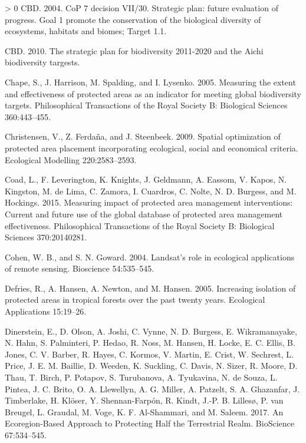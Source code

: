 \documentclass[11pt]{article}
\newlength{\cslhangindent}
\newenvironment{CSLReferences}[3] %
 {%
  \setlength{\parindent}{0pt}
  \ifodd #1 \everypar{\setlength{\hangindent}{\cslhangindent}}\ignorespaces\fi
  \ifnum #2 > 0
  \setlength{\parskip}{#2\baselineskip}
  \fi
 }%
 {}
\begin{document}
\begin{CSLReferences}{1}{0}
\leavevmode\hypertarget{ref-cbd2004}{}%
CBD. 2004. CoP 7 decision VII/30. Strategic plan: future evaluation of
progress. Goal 1 promote the conservation of the biological diversity of
ecosystems, habitats and biomes; Target 1.1.

\leavevmode\hypertarget{ref-cbd2010}{}%
CBD. 2010. The strategic plan for biodiversity 2011-2020 and the Aichi
biodiversity targests.

\leavevmode\hypertarget{ref-chapeMeasuringExtentEffectiveness2005}{}%
Chape, S., J. Harrison, M. Spalding, and I. Lysenko. 2005. Measuring the
extent and effectiveness of protected areas as an indicator for meeting
global biodiversity targets. Philosophical Transactions of the Royal
Society B: Biological Sciences 360:443--455.

\leavevmode\hypertarget{ref-christensen2009}{}%
Christensen, V., Z. Ferdaña, and J. Steenbeek. 2009. Spatial
optimization of protected area placement incorporating ecological,
social and economical criteria. Ecological Modelling 220:2583--2593.

\leavevmode\hypertarget{ref-coadMeasuringImpactProtected2015}{}%
Coad, L., F. Leverington, K. Knights, J. Geldmann, A. Eassom, V. Kapos,
N. Kingston, M. de Lima, C. Zamora, I. Cuardros, C. Nolte, N. D.
Burgess, and M. Hockings. 2015. Measuring impact of protected area
management interventions: Current and future use of the global database
of protected area management effectiveness. Philosophical Transactions
of the Royal Society B: Biological Sciences 370:20140281.

\leavevmode\hypertarget{ref-cohen2004}{}%
Cohen, W. B., and S. N. Goward. 2004. Landsat's role in ecological
applications of remote sensing. Bioscience 54:535--545.

\leavevmode\hypertarget{ref-defries2005}{}%
Defries, R., A. Hansen, A. Newton, and M. Hansen. 2005. Increasing
isolation of protected areas in tropical forests over the past twenty
years. Ecological Applications 15:19--26.

\leavevmode\hypertarget{ref-dinersteinEcoregionBasedApproachProtecting2017}{}%
Dinerstein, E., D. Olson, A. Joshi, C. Vynne, N. D. Burgess, E.
Wikramanayake, N. Hahn, S. Palminteri, P. Hedao, R. Noss, M. Hansen, H.
Locke, E. C. Ellis, B. Jones, C. V. Barber, R. Hayes, C. Kormos, V.
Martin, E. Crist, W. Sechrest, L. Price, J. E. M. Baillie, D. Weeden, K.
Suckling, C. Davis, N. Sizer, R. Moore, D. Thau, T. Birch, P. Potapov,
S. Turubanova, A. Tyukavina, N. de Souza, L. Pintea, J. C. Brito, O. A.
Llewellyn, A. G. Miller, A. Patzelt, S. A. Ghazanfar, J. Timberlake, H.
Klöser, Y. Shennan-Farpón, R. Kindt, J.-P. B. Lillesø, P. van Breugel,
L. Graudal, M. Voge, K. F. Al-Shammari, and M. Saleem. 2017. An
Ecoregion-Based Approach to Protecting Half the Terrestrial Realm.
BioScience 67:534--545.


\end{CSLReferences}
\end{document}
